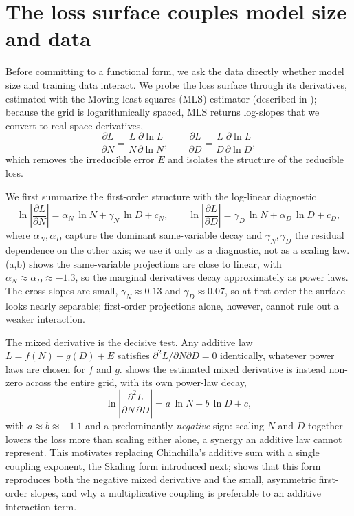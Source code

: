 \documentclass[]{fairmeta}
\newcommand{\ska}{Skaling}
\begin{document}
\section{The loss surface couples model size and data}
\label{sec:motivation}

Before committing to a functional form, we ask the data directly whether model size and training data interact. We probe the loss surface through its derivatives, estimated with the Moving least squares (MLS) \cite{lancaster1981surfaces} estimator (described in ); because the grid is logarithmically spaced, MLS returns log-slopes that we convert to real-space derivatives,
\[
\frac{\partial L}{\partial N}=\frac{L}{N}\frac{\partial\ln L}{\partial\ln N},\qquad
\frac{\partial L}{\partial D}=\frac{L}{D}\frac{\partial\ln L}{\partial\ln D},
\]
which removes the irreducible error $E$ and isolates the structure of the reducible loss.

We first summarize the first-order structure with the log-linear diagnostic
\begin{equation}\label{eq:general_grad}
\ln\!\left|\frac{\partial L}{\partial N}\right| = \alpha_N\,\ln N + \gamma_N\,\ln D + c_N, \qquad
\ln\!\left|\frac{\partial L}{\partial D}\right| = \gamma_D\,\ln N + \alpha_D\,\ln D + c_D,
\end{equation}
where $\alpha_N,\alpha_D$ capture the dominant same-variable decay and $\gamma_N,\gamma_D$ the residual dependence on the other axis; we use it only as a diagnostic, not as a scaling law. (a,b) shows the same-variable projections are close to linear, with $\alpha_N\approx\alpha_D\approx-1.3$, so the marginal derivatives decay approximately as power laws. The cross-slopes are small, $\gamma_N\approx0.13$ and $\gamma_D\approx0.07$, so at first order the surface looks nearly separable; first-order projections alone, however, cannot rule out a weaker interaction.

The mixed derivative is the decisive test. Any additive law $L=f(N)+g(D)+E$ satisfies $\partial^{2}L/\partial N\partial D=0$ identically, whatever power laws are chosen for $f$ and $g$.  shows the estimated mixed derivative is instead non-zero across the entire grid, with its own power-law decay,
\begin{equation}\label{eq:cross_deriv}
\ln\!\left|\frac{\partial^{2}L}{\partial N\,\partial D}\right| = a\,\ln N + b\,\ln D + c,
\end{equation}
with $a\approx b\approx-1.1$ and a predominantly \emph{negative} sign: scaling $N$ and $D$ together lowers the loss more than scaling either alone, a synergy an additive law cannot represent. This motivates replacing Chinchilla's additive sum with a single coupling exponent, the \ska{} form introduced next;  shows that this form reproduces both the negative mixed derivative and the small, asymmetric first-order slopes, and why a multiplicative coupling is preferable to an additive interaction term.
\end{document}
